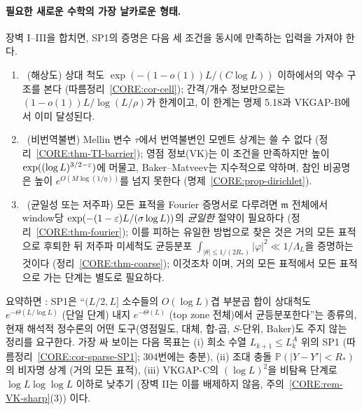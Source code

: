 \paragraph{필요한 새로운 수학의 가장 날카로운 형태.} 장벽 I–III을 합치면, SP1의 증명은 다음 세 조건을 동시에 만족하는 입력을 가져야 한다.
\begin{enumerate}[label=(N\arabic*)]
\item \PROVED\ (해상도) 상대 척도 $\exp(-(1-o(1))L/(C\log L))$ 이하에서의 약수 구조를 본다 (따름정리~\ref{CORE:cor-cell}); 간격/개수 정보만으로는 $(1-o(1))L/\log(L/\rho)$가 한계이고, 이 한계는 명제 5.18과 VKGAP-B에서 이미 달성된다.
\item \PROVED\ (비번역불변) Mellin 변수 $\tau$에서 번역불변인 모멘트 상계는 쓸 수 없다 (정리~\ref{CORE:thm-TI-barrier}); 영점 정보(VK)는 이 조건을 만족하지만 높이 $\exp((\log L)^{3/2-\varepsilon})$에 머물고, Baker–Matveev는 지수적으로 약하며, 참인 비공명은 높이 $e^{O(M\log(1/\eta))}$를 넘지 못한다 (명제~\ref{CORE:prop-dirichlet}).
\item \PROVED\ (균일성 또는 저주파) 모든 표적을 Fourier 증명서로 다루려면 $\mathfrak m$ 전체에서 window당 $\exp(-(1-\varepsilon)L/(\sigma\log L))$의 \emph{균일한} 절약이 필요하다 (정리~\ref{CORE:thm-fourier}); 이를 피하는 유일한 방법으로 찾은 것은 거의 모든 표적으로 후퇴한 뒤 저주파 미세척도 균등분포 $\int_{|\theta|\le1/(2R_*)}|\varphi|^2\ll1/\Lambda_L$을 증명하는 것이다 (정리~\ref{CORE:thm-coarse}); 이것조차 \OPEN{}이며, 거의 모든 표적에서 모든 표적으로 가는 단계는 별도로 필요하다.
\end{enumerate}
요약하면 \HEUR: SP1은 ``$(L/2,L]$ 소수들의 $O(\log L)$겹 부분곱 합이 상대척도 $e^{-\Theta(L/\log L)}$ (단일 단계) 내지 $e^{-\Theta(L)}$ (top zone 전체)에서 균등분포한다''는 종류의, 현재 해석적 정수론의 어떤 도구(영점밀도, 대체, 합-곱, $S$-단위, Baker)도 주지 않는 정리를 요구한다. 가장 싸 보이는 다음 목표는 (i) 희소 수열 $L_{k+1}\le L_k^A$ 위의 SP1 (따름정리~\ref{CORE:cor-sparse-SP1}; 304번에는 충분), (ii) 조대 충돌 $\mathbb P(|Y-Y'|<R_*)$의 비자명 상계 (거의 모든 표적), (iii) VKGAP-C의 $(\log L)^2$을 비탐욕 단계로 $\log L\log\log L$ 이하로 낮추기 (장벽 II는 이를 배제하지 않음, 주의~\ref{CORE:rem-VK-sharp}(3)) 이다.

